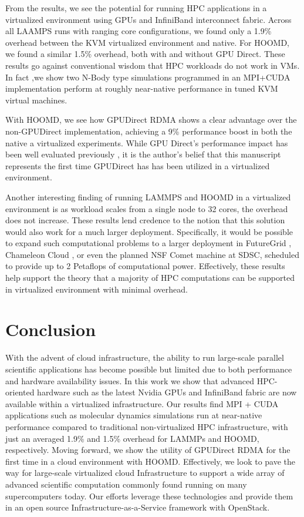 \documentclass{sigplanconf}
\begin{document}
From the results, we see the potential for running HPC applications in a virtualized environment using GPUs and InfiniBand interconnect fabric. Across all LAAMPS runs with ranging core configurations, we found only a 1.9\% overhead between the KVM virtualized environment and native. For HOOMD, we found a similar 1.5\% overhead, both with and without GPU Direct. These results go against conventional wisdom that HPC workloads do not work in VMs. In fact ,we show two N-Body type simulations programmed in an MPI+CUDA implementation perform at roughly near-native performance in tuned KVM virtual machines.  

With HOOMD, we see how GPUDirect RDMA shows a clear advantage over the non-GPUDirect implementation, achieving a 9\% performance boost in both the native a virtualized experiments.  While GPU Direct's performance impact has been well evaluated previously \cite{GPUDirect}, it is the author's belief that this manuscript represents the first time GPUDirect has has been utilized in a virtualized environment.  

Another interesting finding of running LAMMPS and HOOMD in a virtualized environment is as workload scales from a single node to 32 cores, the overhead does not increase. These results lend credence to the notion that this solution would also work for a much larger deployment. Specifically, it would be possible to expand such computational problems to a larger deployment in FutureGrid \cite{fox2013futuregrid}, Chameleon Cloud \cite{www-chameleon}, or even the planned NSF Comet machine at SDSC, scheduled to provide up to 2 Petaflops of computational power. Effectively, these results help support the theory that a majority of HPC computations can be supported in virtualized environment with minimal overhead. 


\section{Conclusion}

With the advent of cloud infrastructure, the ability to run large-scale parallel scientific applications has become possible but limited due to both performance and hardware availability issues. In this work we show that advanced HPC-oriented hardware such as the latest Nvidia GPUs and InfiniBand fabric are now available within a virtualized infrastructure. Our results find MPI + CUDA applications such as molecular dynamics simulations run at near-native performance compared to traditional non-virtualized HPC infrastructure, with just an averaged 1.9\% and 1.5\% overhead for LAMMPs and HOOMD, respectively. Moving forward, we show the utility of GPUDirect RDMA for the first time in a cloud environment with HOOMD.  Effectively, we look to pave the way for large-scale virtualized cloud Infrastructure to support a wide array of advanced scientific computation commonly found running on many supercomputers today.  Our efforts leverage these technologies and provide them in an open source Infrastructure-as-a-Service framework with OpenStack.  
\end{document}
